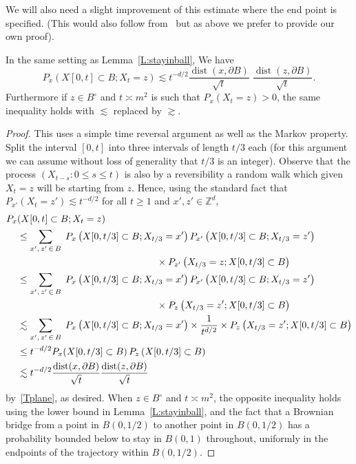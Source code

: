 \documentclass[AHL, Unicode, longabstracts, published]{cedram}
\DeclareMathOperator{\dist}{dist}
\newcommand{\Pmh}{P}
\begin{document}
We will also need a slight improvement of this estimate where the end point is specified. (This would also follow from~\cite[Proposition~6.9.4.]{LL} but as above we prefer to provide our own proof).

\begin{lemm}\label{L:stayinball_bridge}
In the same setting as Lemma~\ref{L:stayinball},
We have
\[
\Pmh_x (X[0, t] \subset B; X_t = z) \lesssim t^{ - d/2} \frac{\dist(x, \partial B)}{\sqrt{t}}\;\frac{\dist(z, \partial B)}{\sqrt{t}}.
\]
Furthermore if $z \in B^\circ$ and $t \asymp m^2$ is such that $\Pmh_x(X_t = z)>0$, the same inequality holds with $\lesssim$ replaced by $\gtrsim$.
\end{lemm}

\begin{proof}
This uses a simple time reversal argument as well as the Markov property. Split the interval $[0,t]$ into three intervals of length $t /3$ each (for this argument we can assume without loss of generality that $t/3$ is an integer). Observe that the process $(X_{t-s} : 0 \le s \le t)$ is also by a reversibility a random walk which given $X_t =z$ will be starting from $z$. Hence, using the standard fact that $\Pmh_{x'}(X_t = z') \lesssim t^{-d/2}$ for all $t \ge 1$ and $x', z' \in \mathbb{Z}^d$,
\begin{align*}
\Pmh_x & (X[0, t] \subset B; X_t = z) \\
& \le \sum_{x',\,z'\,\in\,B}\;\Pmh_x\left(X[0, t/3] \subset B; X_{t/3} = x'\right) \Pmh_{x'} \left(X[0, t /3] \subset B; X_{t/3} = z'\right) \\
& \mkern260mu \times \Pmh_{z'} \left(X_{t/3} = z; X[0, t/3] \subset B\right)\\
& \le \sum_{x',\,z'\,\in\,B}\;\Pmh_x\left(X[0, t/3] \subset B; X_{t/3} = x'\right) \Pmh_{x'} \left(X[0, t /3] \subset B; X_{t/3} = z'\right) \\
& \mkern260mu \times \Pmh_{z} \left(X_{t/3} = z'; X[0, t/3] \subset B\right)\\
& \lesssim \sum_{x',\,z'\,\in\,B}\;\Pmh_x\left(X[0, t/3] \subset B; X_{t/3} = x'\right) \times \frac1{t^{d/2}} \times \Pmh_{z} \left(X_{t/3} = z'; X[0, t/3] \subset B\right)\\
& \le t^{ - d/2} \Pmh_x (X[0, t/3] \subset B) \,\Pmh_z\,(X[0, t / 3] \subset B)\\
& \lesssim t^{ - d/2} \frac{\dist(x, \partial B)}{\sqrt{t}} \frac{\dist(z, \partial B)}{\sqrt{t}}
\end{align*}
by~\eqref{Tplane}, as desired. When $z \in B^\circ$ and $t \asymp m^2$, the opposite inequality holds using the lower bound in Lemma~\ref{L:stayinball}, and the fact that a Brownian bridge from a point in $B(0,1/2)$ to another point in $B(0,1/2)$ has a probability bounded below to stay in $B(0,1)$ throughout, uniformly in the endpoints of the trajectory within $B(0,1/2)$.
\end{proof}
\end{document}
